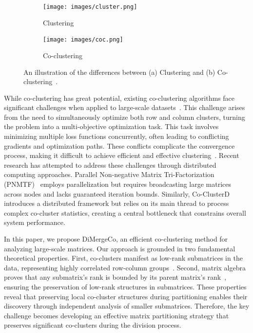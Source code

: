 \documentclass[journal]{IEEEtran}
\renewcommand{\cite}[1]{~\autocite{#1}}
\begin{document}
\begin{figure}[!t]
    \centering
    \begin{subfigure}[b]{0.22\textwidth}
        \centering
        \texttt{[image: images/cluster.png]}
        \caption{Clustering}
        \label{fig:cluster}
    \end{subfigure}%
    \hfill
    \begin{subfigure}[b]{0.22\textwidth}
        \centering
        \texttt{[image: images/coc.png]}
        \caption{Co-clustering}
        \label{fig:cocluster}
    \end{subfigure}%
    \caption{An illustration of the differences between (a) Clustering and (b) Co-clustering\cite{yan2017CoclusteringMultidimensionalBig}.}
    \label{fig:cocomparison}
\end{figure}


While co-clustering has great potential, existing co-clustering algorithms face significant challenges when applied to large-scale datasets\cite{cheng2015CoClusterDDistributedFramework}. This challenge arises from the need to simultaneously optimize both row and column clusters, turning the problem into a multi-objective optimization task. This task involves minimizing multiple loss functions concurrently, often leading to conflicting gradients and optimization paths. These conflicts complicate the convergence process, making it difficult to achieve efficient and effective clustering\cite{coello2007EvolutionaryAlgorithmsSolving}. Recent research has attempted to address these challenges through distributed computing approaches. Parallel Non-negative Matrix Tri-Factorization (PNMTF)\cite{chen2023ParallelNonNegativeMatrix} employs parallelization but requires broadcasting large matrices across nodes and lacks guaranteed iteration bounds. Similarly, Co-ClusterD\cite{cheng2015CoClusterDDistributedFramework} introduces a distributed framework but relies on its main thread to process complex co-cluster statistics, creating a central bottleneck that constrains overall system performance.

In this paper, we propose DiMergeCo, an efficient co-clustering method for analyzing large-scale matrices. Our approach is grounded in two fundamental theoretical properties. First, co-clusters manifest as low-rank submatrices in the data, representing highly correlated row-column groups\cite{zhao2016IdentifyingMultidimensionalCoclusters,wu2024ScalableCoClusteringLargeScale}. Second, matrix algebra proves that any submatrix's rank is bounded by its parent matrix's rank\cite{horn1985MatrixAnalysis}, ensuring the preservation of low-rank structures in submatrices. These properties reveal that preserving local co-cluster structures during partitioning enables their discovery through independent analysis of smaller submatrices. Therefore, the key challenge becomes developing an effective matrix partitioning strategy that preserves significant co-clusters during the division process.
\end{document}
